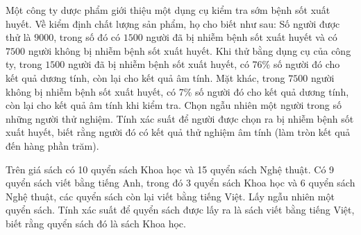 \begin{ex}%
    Một công ty dược phẩm giới thiệu một dụng cụ kiểm tra sớm bệnh sốt xuất huyết. Về kiểm định chất lượng sản phẩm, họ cho biết như sau: Số người được thử là $9000$, trong số đó có $1500$ người đã bị nhiễm bệnh sốt xuất huyết và có $7500$ người không bị nhiễm bệnh sốt xuất huyết. Khi thử bằng dụng cụ của công ty, trong $1500$ người đã bị nhiễm bệnh sốt xuất huyết, có 76\% số người đó cho kết quả dương tính, còn lại cho kết quả âm tính. Mặt khác, trong $7500$ người không bị nhiễm bệnh sốt xuất huyết, có 7\% số người đó cho kết quả dương tính, còn lại cho kết quả âm tính khi kiểm tra. Chọn ngẫu nhiên một người trong số những người thử nghiệm. Tính xác suất để người được chọn ra bị nhiễm bệnh sốt xuất huyết, biết rằng người đó có kết quả thử nghiệm âm tính (làm tròn kết quả đến hàng phần trăm).
\end{ex}
\begin{ex}%
    Trên giá sách có 10 quyển sách Khoa học và 15 quyển sách Nghệ thuật. Có 9 quyển sách viết bằng tiếng Anh, trong đó 3 quyển sách Khoa học và 6 quyển sách Nghệ thuật, các quyển sách còn lại viết bằng tiếng Việt. Lấy ngẫu nhiên một quyển sách. Tính xác suất để quyển sách được lấy ra là sách viết bằng tiếng Việt, biết rằng quyển sách đó là sách Khoa học.
\end{ex}
